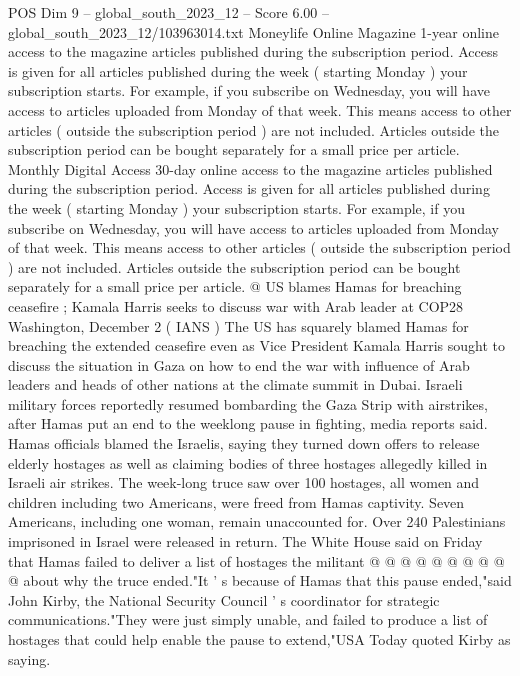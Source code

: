 \begin{textsample}{POS Dim 9 – global\_south\_2023\_12 – Score 6.00 – global\_south\_2023\_12/103963014.txt}  \label{ex:f9_pos_003}
Moneylife Online Magazine 1-year online access to the magazine articles published during the subscription period.
Access is given for all articles published during the week ( starting Monday ) your subscription starts.
For example, if you subscribe on Wednesday, you will have access to articles uploaded from Monday of that week.
This means access to other articles ( outside the subscription period ) are not included.
Articles outside the subscription period can be bought separately for a small price per article.
Monthly Digital Access 30-day online access to the magazine articles published during the subscription period.
Access is given for all articles published during the week ( starting Monday ) your subscription starts.
For example, if you subscribe on Wednesday, you will have access to articles uploaded from Monday of that week.
This means access to other articles ( outside the subscription period ) are not included.
Articles outside the subscription period can be bought separately for a small price per article. @ US blames Hamas for breaching ceasefire ; Kamala Harris seeks to discuss war with Arab leader at COP28 Washington, December 2 ( IANS ) The US has squarely blamed Hamas for breaching the extended ceasefire even as Vice President Kamala Harris sought to discuss the situation in Gaza on how to end the war with influence of Arab leaders and heads of other nations at the climate summit in Dubai.
Israeli military forces reportedly resumed bombarding the Gaza Strip with airstrikes, after Hamas put an end to the weeklong pause in fighting, media reports said.
Hamas officials blamed the Israelis, saying they turned down offers to release elderly hostages as well as claiming bodies of three hostages allegedly killed in Israeli air strikes.
The week-long truce saw over 100 hostages, all women and children including two Americans, were freed from Hamas captivity.
Seven Americans, including one woman, remain unaccounted for.
Over 240 Palestinians imprisoned in Israel were released in return.
The White House said on Friday that Hamas failed to deliver a list of hostages the militant @ @ @ @ @ @ @ @ @ @ about why the truce ended."It ' s because of Hamas that this pause ended,"said John Kirby, the National Security Council ' s coordinator for strategic communications."They were just simply unable, and failed to produce a list of hostages that could help enable the pause to extend,"USA Today quoted Kirby as saying.

\end{textsample}
